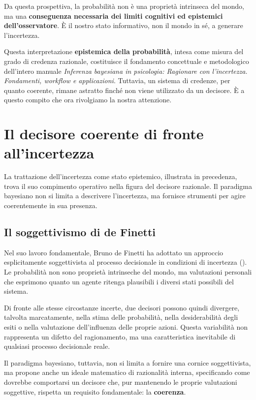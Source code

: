 \documentclass[
  italian,
  letterpaper,
  a4paper,
  11pt,
  open=any]{scrbook}
\theoremstyle{plain}
\theoremstyle{definition}
\theoremstyle{definition}
\theoremstyle{remark}
\begin{document}
Da questa prospettiva, la probabilità non è una proprietà intrinseca del
mondo, ma una \textbf{conseguenza necessaria dei limiti cognitivi ed
epistemici dell'osservatore}. È il nostro stato informativo, non il
mondo in sé, a generare l'incertezza.

Questa interpretazione \textbf{epistemica della probabilità}, intesa
come misura del grado di credenza razionale, costituisce il fondamento
concettuale e metodologico dell'intero manuale \emph{Inferenza bayesiana
in psicologia: Ragionare con l'incertezza. Fondamenti, workflow e
applicazioni}. Tuttavia, un sistema di credenze, per quanto coerente,
rimane astratto finché non viene utilizzato da un decisore. È a questo
compito che ora rivolgiamo la nostra attenzione.

\section{Il decisore coerente di fronte
all'incertezza}\label{il-decisore-coerente-di-fronte-allincertezza}

La trattazione dell'incertezza come stato epistemico, illustrata in
precedenza, trova il suo compimento operativo nella figura del decisore
razionale. Il paradigma bayesiano non si limita a descrivere
l'incertezza, ma fornisce strumenti per agire coerentemente in sua
presenza.

\subsection{Il soggettivismo di de
Finetti}\label{il-soggettivismo-di-de-finetti}

Nel suo lavoro fondamentale, Bruno de Finetti ha adottato un approccio
esplicitamente soggettivista al processo decisionale in condizioni di
incertezza (). Le probabilità
non sono proprietà intrinseche del mondo, ma valutazioni personali che
esprimono quanto un agente ritenga plausibili i diversi stati possibili
del sistema.

Di fronte alle stesse circostanze incerte, due decisori possono quindi
divergere, talvolta marcatamente, nella stima delle probabilità, nella
desiderabilità degli esiti o nella valutazione dell'influenza delle
proprie azioni. Questa variabilità non rappresenta un difetto del
ragionamento, ma una caratteristica inevitabile di qualsiasi processo
decisionale reale.

Il paradigma bayesiano, tuttavia, non si limita a fornire una cornice
soggettivista, ma propone anche un ideale matematico di razionalità
interna, specificando come dovrebbe comportarsi un decisore che, pur
mantenendo le proprie valutazioni soggettive, rispetta un requisito
fondamentale: la \textbf{coerenza}.
\end{document}
